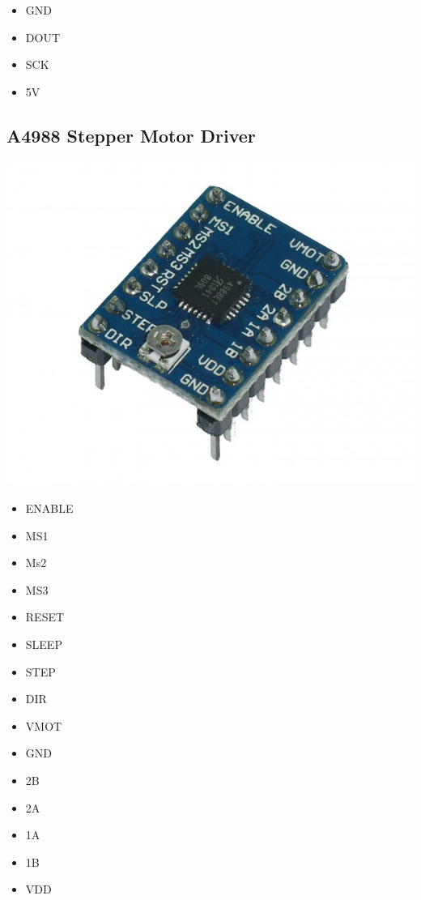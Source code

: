 \documentclass[12pt,letterpaper]{article}
\begin{document}
	\begin{itemize}
	\item GND
	\item DOUT
	\item SCK
	\item 5V
	\end{itemize}

	\newpage	
	
	\subsection{A4988 Stepper Motor Driver}

	\begin{center}
	\includegraphics[scale=0.3]{pololu}
	\end{center}
	
	\begin{itemize}
	\item ENABLE
	\item MS1
	\item Ms2
	\item MS3
	\item RESET
	\item SLEEP
	\item STEP
	\item DIR
	\item VMOT
	\item GND
	\item 2B
	\item 2A
	\item 1A
	\item 1B
	\item VDD
	\end{itemize}
	
\end{document}
